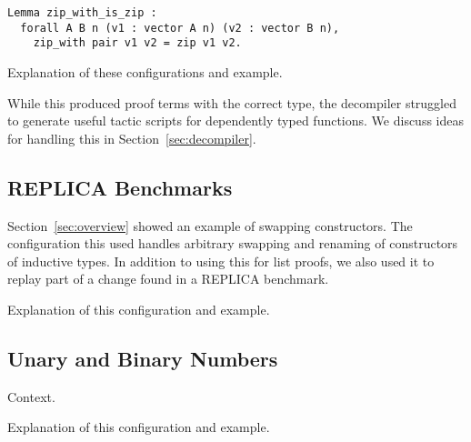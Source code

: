 \begin{lstlisting}
Lemma zip_with_is_zip :
  forall A B n (v1 : vector A n) (v2 : vector B n),
    zip_with pair v1 v2 = zip v1 v2.
\end{lstlisting}

Explanation of these configurations and example.

While this produced proof terms with the correct type, the decompiler struggled
to generate useful tactic scripts for dependently typed functions.
We discuss ideas for handling this in Section~\ref{sec:decompiler}.

\subsection{REPLICA Benchmarks}
\label{sec:replica}

Section~\ref{sec:overview} showed an example of swapping constructors.
The configuration this used handles arbitrary swapping and renaming of constructors of inductive types.
In addition to using this for list proofs, we also used it to replay part of a change found in
a REPLICA benchmark.

Explanation of this configuration and example.

\subsection{Unary and Binary Numbers}
\label{sec:bin}

Context.

Explanation of this configuration and example.





